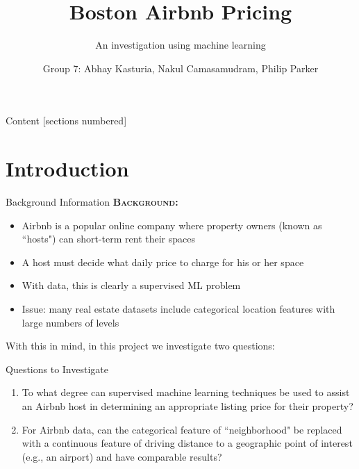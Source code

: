 \documentclass[10pt]{beamer}
\title{Boston Airbnb Pricing}
\subtitle{An investigation using machine learning}
\date{}
\author{Group 7: Abhay Kasturia, Nakul Camasamudram, Philip Parker}
\institute{Northeastern University}
\begin{document}
\maketitle

\begin{frame}{Content}
  [sections numbered]
  \tableofcontents[hideallsubsections]
\end{frame}


\section{Introduction}
	\begin{frame}{Background Information}
    	\textbf{\textsc{Background:}}
    	\begin{itemize}
            \item Airbnb is a popular online company where property owners (known as ``hosts") can short-term rent their spaces
            \item A host must decide what daily price to charge for his or her space
            \item With data, this is clearly a supervised ML problem
            \item Issue: many real estate datasets include categorical location features with large numbers of levels
        \end{itemize}
        
        With this in mind, in this project we investigate two questions:
    \end{frame}
    
    \begin{frame}{Questions to Investigate}
    	\begin{enumerate}
            \item To what degree can supervised machine learning techniques be used to assist an Airbnb host in determining an appropriate listing price for their property?
            \item For Airbnb data, can the categorical feature of ``neighborhood" be replaced with a continuous feature of driving distance to a geographic point of interest (e.g., an airport) and have comparable results?
        \end{enumerate}
    \end{frame}
\end{document}
